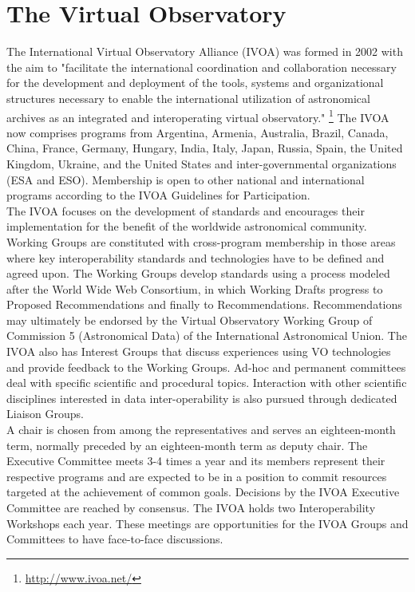 \chapter{The Virtual Observatory}

The International Virtual Observatory Alliance (IVOA) was formed in 2002 with the aim to "facilitate the international coordination and collaboration necessary for the development and deployment of the tools, systems and organizational structures necessary to enable the international utilization of astronomical archives as an integrated and interoperating virtual observatory." \footnote{\url{http://www.ivoa.net/}} The IVOA now comprises programs from Argentina, Armenia, Australia, Brazil, Canada, China,  France, Germany, Hungary, India, Italy, Japan, Russia, Spain, the United Kingdom, Ukraine, and the United States and inter-governmental organizations (ESA and ESO). Membership is open to other national and international programs according to the IVOA Guidelines for Participation.\\

The IVOA focuses on the development of standards and encourages their implementation for the benefit of the worldwide astronomical community. Working Groups are constituted with cross-program membership in those areas where key interoperability standards and technologies have to be defined and agreed upon. The Working Groups develop standards using a process modeled after the World Wide Web Consortium, in which Working Drafts progress to Proposed Recommendations and finally to Recommendations. Recommendations may ultimately be endorsed by the Virtual Observatory Working Group of Commission 5 (Astronomical Data) of the International Astronomical Union. The IVOA also has Interest Groups that discuss experiences using VO technologies and provide feedback to the Working Groups. Ad-hoc and permanent committees deal with specific scientific and procedural topics. Interaction with other scientific disciplines interested in data inter-operability is also pursued through dedicated Liaison Groups.\\

A chair is chosen from among the representatives and serves an eighteen-month term, normally preceded by an eighteen-month term as deputy chair. The Executive Committee meets 3-4 times a year and its members represent their respective programs and are expected to be in a position to commit resources targeted at the achievement of common goals. Decisions by the IVOA Executive Committee are reached by consensus. The IVOA holds two Interoperability Workshops each year. These meetings are opportunities for the IVOA Groups and Committees to have face-to-face discussions.\\

